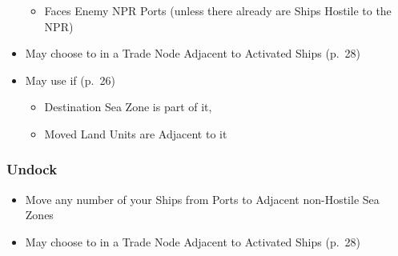 \documentclass[10pt]{article}
\begin{document}
\begin{itemize}
\begin{itemize}
		\item Faces Enemy NPR Ports (unless there already are Ships Hostile to the NPR)
	\end{itemize}
	\item May choose to  in a Trade Node Adjacent to Activated Ships (p.~28)
	\item {}May use  if (p.~26)
	\begin{itemize}
		\item Destination Sea Zone is part of it, 
		\item Moved Land Units are Adjacent to it
	\end{itemize}
\end{itemize}
\subsubsection*{Undock}
\begin{itemize}
	\item Move any number of your Ships from Ports to Adjacent non-Hostile Sea Zones
	\item May choose to  in a Trade Node Adjacent to Activated Ships (p.~28)
\end{itemize}
\end{document}
